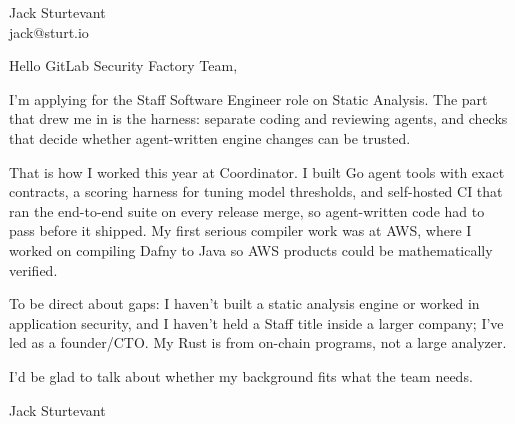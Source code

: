 \documentclass[11pt]{article}
\begin{document}
\raggedright

{\namefont\fontsize{20pt}{24pt}\selectfont Jack Sturtevant}\\[-0.3em]
jack@sturt.io

\vspace{1.2em}

Hello GitLab Security Factory Team,

I'm applying for the Staff Software Engineer role on Static Analysis. The part that drew me in is the harness: separate coding and reviewing agents, and checks that decide whether agent-written engine changes can be trusted.

That is how I worked this year at Coordinator. I built Go agent tools with exact contracts, a scoring harness for tuning model thresholds, and self-hosted CI that ran the end-to-end suite on every release merge, so agent-written code had to pass before it shipped. My first serious compiler work was at AWS, where I worked on compiling Dafny to Java so AWS products could be mathematically verified.

To be direct about gaps: I haven't built a static analysis engine or worked in application security, and I haven't held a Staff title inside a larger company; I've led as a founder/CTO. My Rust is from on-chain programs, not a large analyzer.

I'd be glad to talk about whether my background fits what the team needs.

\vspace{0.6em}
Jack Sturtevant
\end{document}
